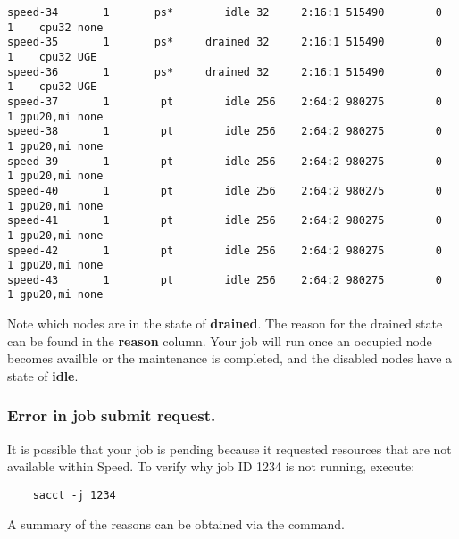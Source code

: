 \begin{verbatim}
speed-34       1       ps*        idle 32     2:16:1 515490        0      1    cpu32 none
speed-35       1       ps*     drained 32     2:16:1 515490        0      1    cpu32 UGE
speed-36       1       ps*     drained 32     2:16:1 515490        0      1    cpu32 UGE
speed-37       1        pt        idle 256    2:64:2 980275        0      1 gpu20,mi none
speed-38       1        pt        idle 256    2:64:2 980275        0      1 gpu20,mi none
speed-39       1        pt        idle 256    2:64:2 980275        0      1 gpu20,mi none
speed-40       1        pt        idle 256    2:64:2 980275        0      1 gpu20,mi none
speed-41       1        pt        idle 256    2:64:2 980275        0      1 gpu20,mi none
speed-42       1        pt        idle 256    2:64:2 980275        0      1 gpu20,mi none
speed-43       1        pt        idle 256    2:64:2 980275        0      1 gpu20,mi none
\end{verbatim}
\normalsize

\noindent Note which nodes are in the state of \textbf{drained}.
The reason for the drained state can be found in the \textbf{reason} column.
Your job will run once an occupied node becomes availble or the maintenance is completed,
and the disabled nodes have a state of \textbf{idle}.

\subsubsection{Error in job submit request.}
It is possible that your job is pending because it requested resources that are not available within Speed. 
To verify why job ID 1234 is not running, execute:
\begin{verbatim}
	sacct -j 1234
\end{verbatim}

\noindent A summary of the reasons can be obtained via the  command.